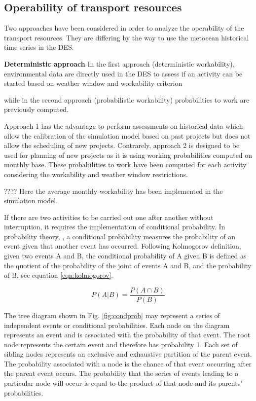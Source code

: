 \subsection{Operability of transport resources}
Two approaches have been considered in order to analyze the operability of the transport resources. They are differing by the way to use the metocean historical time series in the DES.

\textbf{Deterministic approach}
In the first approach (deterministic workability), environmental data are directly used in the DES to assess if an activity can be started based on weather window and workability criterion





while in the second approach (probabilistic workability) probabilities to work are previously computed.

Approach 1 has the advantage to perform assessments on historical data which allow the calibration of the simulation model based on past projects but does not allow the scheduling of new projects. Contrarely, approach 2 is designed to be used for planning of new projects as it is using working probabilities computed on monthly base. These probabilities to work have been computed for each activity considering the workability and weather window restrictions.






???? Here the average monthly workability has been implemented in the simulation model. 

If there are two activities to be carried out one after another without interruption, it requires the implementation of conditional probability.  
In probability theory, \cite{Thalemann2012}, a conditional probability measures the probability of an event given that another event has occurred. Following Kolmogorov definition, given two events A and B, the conditional probability of A given B is defined as the quotient of the probability of the joint of events A and B, and the probability of B, see equation \ref{eqn:kolmogorov}.

\begin{equation}
\label{eqn:kolmogorov}
P \left(A \vert B \right) = \frac{P \left(A \cap B \right)}{P \left( B \right)}
\end{equation}

The tree diagram shown in Fig. \ref{fig:condprob} may represent a series of independent events or conditional probabilities. Each node on the diagram represents an event and is associated with the probability of that event. The root node represents the certain event and therefore has probability 1. Each set of sibling nodes represents an exclusive and exhaustive partition of the parent event. The probability associated with a node is the chance of that event occurring after the parent event occurs. The probability that the series of events leading to a particular node will occur is equal to the product of that node and its parents' probabilities.


